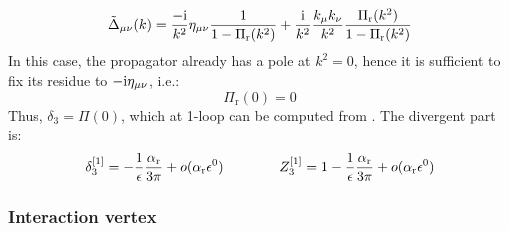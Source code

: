 \begin{equation}
  \tilde{\Delta}_{\mu \nu}(k) = \frac{- \mathrm{i}}{k^2} \eta_{\mu \nu} \frac{1}{1 - \Pi_\text{r}(k^2)} + \frac{\mathrm{i}}{k^2} \frac{k_\mu k_\nu}{k^2} \frac{\Pi_\text{r}(k^2)}{1 - \Pi_\text{r}(k^2)}
\end{equation}
In this case, the propagator already has a pole at $ k^2 = 0 $, hence it is sufficient to fix its residue to $ -\mathrm{i} \eta_{\mu \nu} $, i.e.:
\begin{equation}
  \Pi_\text{r}(0) = 0
\end{equation}
Thus, $ \delta_3 = \Pi(0) $, which at 1-loop can be computed from . The divergent part is:
\begin{equation}
  \delta_3^{[1]} = - \frac{1}{\epsilon} \frac{\alpha_\text{r}}{3\pi} + o(\alpha_\text{r} \epsilon^0)
  \qquad \qquad
  Z_3^{[1]} = 1 - \frac{1}{\epsilon} \frac{\alpha_\text{r}}{3\pi} + o(\alpha_\text{r} \epsilon^0)
\end{equation}

\subsubsection{Interaction vertex}

